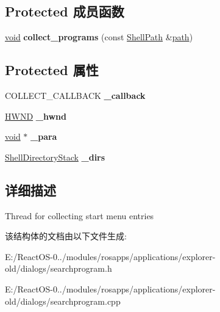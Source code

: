 \subsection*{Protected 成员函数}
\begin{DoxyCompactItemize}
\item 
\mbox{\label{struct_collect_programs_thread_a562dc6a84807acd8ee5719f13537789b}} 
\hyperlink{interfacevoid}{void} {\bfseries collect\+\_\+programs} (const \hyperlink{struct_shell_path}{Shell\+Path} \&\hyperlink{structpath}{path})
\end{DoxyCompactItemize}
\subsection*{Protected 属性}
\begin{DoxyCompactItemize}
\item 
\mbox{\label{struct_collect_programs_thread_a76b65edd6a194d5b525c99f6b299e612}} 
C\+O\+L\+L\+E\+C\+T\+\_\+\+C\+A\+L\+L\+B\+A\+CK {\bfseries \+\_\+callback}
\item 
\mbox{\label{struct_collect_programs_thread_a6af6e7235514481e3875722bea1cc716}} 
\hyperlink{interfacevoid}{H\+W\+ND} {\bfseries \+\_\+hwnd}
\item 
\mbox{\label{struct_collect_programs_thread_aa5f8f0e60aa32331c7bd386bf83af5a0}} 
\hyperlink{interfacevoid}{void} $\ast$ {\bfseries \+\_\+para}
\item 
\mbox{\label{struct_collect_programs_thread_a840c31a166bfe6ebb1cb0b89c256e700}} 
\hyperlink{classstack}{Shell\+Directory\+Stack} {\bfseries \+\_\+dirs}
\end{DoxyCompactItemize}


\subsection{详细描述}
Thread for collecting start menu entries 

该结构体的文档由以下文件生成\+:\begin{DoxyCompactItemize}
\item 
E\+:/\+React\+O\+S-\/0../modules/rosapps/applications/explorer-\/old/dialogs/searchprogram.\+h\item 
E\+:/\+React\+O\+S-\/0../modules/rosapps/applications/explorer-\/old/dialogs/searchprogram.\+cpp\end{DoxyCompactItemize}
